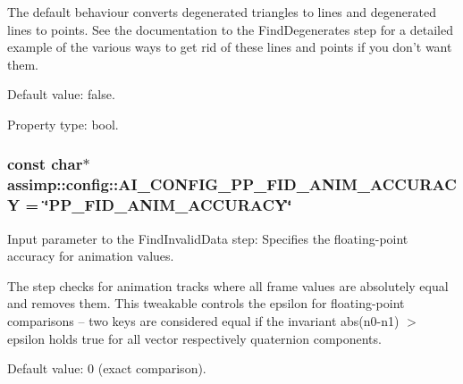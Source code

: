 The default behaviour converts degenerated triangles to lines and degenerated lines to points. See the documentation to the {\ttfamily Find\+Degenerates} step for a detailed example of the various ways to get rid of these lines and points if you don't want them.

Default value\+: false.

Property type\+: bool. \hypertarget{namespaceassimp_1_1config_ade29ae2f53bb0a9bab7464afe44632ff}{
\subsubsection[{A\+I\+\_\+\+C\+O\+N\+F\+I\+G\+\_\+\+P\+P\+\_\+\+F\+I\+D\+\_\+\+A\+N\+I\+M\+\_\+\+A\+C\+C\+U\+R\+A\+C\+Y}]{\setlength{\rightskip}{0pt plus 5cm}const char$\ast$ assimp\+::config\+::\+A\+I\+\_\+\+C\+O\+N\+F\+I\+G\+\_\+\+P\+P\+\_\+\+F\+I\+D\+\_\+\+A\+N\+I\+M\+\_\+\+A\+C\+C\+U\+R\+A\+C\+Y = \char`\"{}P\+P\+\_\+\+F\+I\+D\+\_\+\+A\+N\+I\+M\+\_\+\+A\+C\+C\+U\+R\+A\+C\+Y\char`\"{}}}\label{namespaceassimp_1_1config_ade29ae2f53bb0a9bab7464afe44632ff}
Input parameter to the {\ttfamily Find\+Invalid\+Data} step\+: Specifies the floating-\/point accuracy for animation values.

The step checks for animation tracks where all frame values are absolutely equal and removes them. This tweakable controls the epsilon for floating-\/point comparisons – two keys are considered equal if the invariant abs(n0-\/n1) $>$ epsilon holds true for all vector respectively quaternion components.

Default value\+: 0 (exact comparison).

